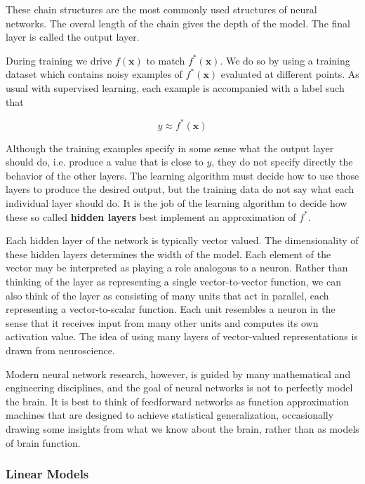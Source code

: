 These chain structures are the most commonly used structures of neural networks. The overal length of the chain gives
the depth of the model. The final layer is called the output layer. 

During training we drive $f(\mathbf{x})$ to match $f^{*}(\mathbf{x})$. We do so by using a training dataset which contains noisy examples of 
$f^{*}(\mathbf{x})$ evaluated at different points. As usual with supervised learning, each example is accompanied with a label such that

\begin{equation}
y \approx f^{*}(\mathbf{x}) 
\end{equation}

Although the training examples specify in some sense what the output layer should do, i.e. produce a value that is close to $y$, they do not
specify directly the behavior of the other layers. The learning algorithm must decide
how to use those layers to produce the desired output, but the training data do
not say what each individual layer should do. It is the job of the learning algorithm to decide how these so called \textbf{hidden layers} best implement
an approximation of $f^{*}$. 

Each hidden layer of the network is typically vector valued. The
dimensionality of these hidden layers determines the
width of the model. Each element of the vector may be interpreted as playing a role analogous to a neuron.
Rather than thinking of the layer as representing a single vector-to-vector function,
we can also think of the layer as consisting of many
units
that act in parallel,
each representing a vector-to-scalar function. Each unit resembles a neuron in
the sense that it receives input from many other units and computes its own
activation value. The idea of using many layers of vector-valued representations
is drawn from neuroscience.

\begin{framed}
\begin{remark}

Modern neural network research,
however, is guided by many mathematical and engineering disciplines, and the
goal of neural networks is not to perfectly model the brain. It is best to think of
feedforward networks as function approximation machines that are designed to
achieve statistical generalization, occasionally drawing some insights from what we
know about the brain, rather than as models of brain function.
\end{remark}
\end{framed}

\subsubsection{Linear Models}

